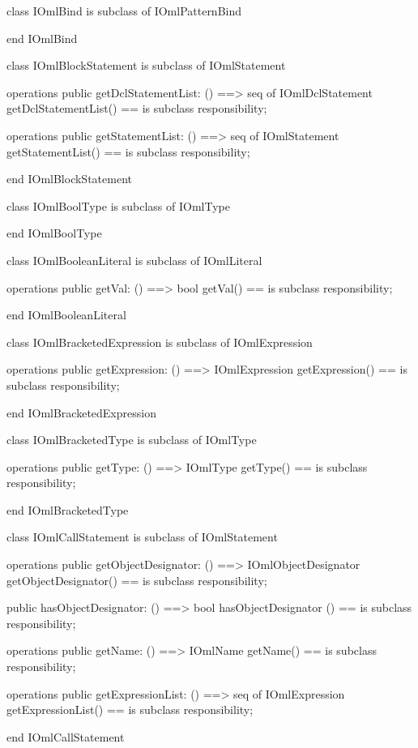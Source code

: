 \begin{vdm_al}
class IOmlBind
 is subclass of IOmlPatternBind

end IOmlBind
\end{vdm_al}

\begin{vdm_al}
class IOmlBlockStatement
 is subclass of IOmlStatement

operations
  public getDclStatementList: () ==> seq of IOmlDclStatement
  getDclStatementList() == is subclass responsibility;

operations
  public getStatementList: () ==> seq of IOmlStatement
  getStatementList() == is subclass responsibility;

end IOmlBlockStatement
\end{vdm_al}

\begin{vdm_al}
class IOmlBoolType
 is subclass of IOmlType

end IOmlBoolType
\end{vdm_al}

\begin{vdm_al}
class IOmlBooleanLiteral
 is subclass of IOmlLiteral

operations
  public getVal: () ==> bool
  getVal() == is subclass responsibility;

end IOmlBooleanLiteral
\end{vdm_al}

\begin{vdm_al}
class IOmlBracketedExpression
 is subclass of IOmlExpression

operations
  public getExpression: () ==> IOmlExpression
  getExpression() == is subclass responsibility;

end IOmlBracketedExpression
\end{vdm_al}

\begin{vdm_al}
class IOmlBracketedType
 is subclass of IOmlType

operations
  public getType: () ==> IOmlType
  getType() == is subclass responsibility;

end IOmlBracketedType
\end{vdm_al}

\begin{vdm_al}
class IOmlCallStatement
 is subclass of IOmlStatement

operations
  public getObjectDesignator: () ==> IOmlObjectDesignator
  getObjectDesignator() == is subclass responsibility;

  public hasObjectDesignator: () ==> bool
  hasObjectDesignator () == is subclass responsibility;

operations
  public getName: () ==> IOmlName
  getName() == is subclass responsibility;

operations
  public getExpressionList: () ==> seq of IOmlExpression
  getExpressionList() == is subclass responsibility;

end IOmlCallStatement
\end{vdm_al}

